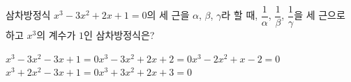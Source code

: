 삼차방정식 $x^3-3x^2+2x+1=0$의 세 근을 $\alpha$, $\beta$, $\gamma$라 할 때, $\dfrac{1}{\alpha}$, $\dfrac{1}{\beta}$, $\dfrac{1}{\gamma}$을 세 근으로 하고 $x^3$의 계수가 $1$인 삼차방정식은?
\begin{choicesv}{$x^3-3x^2-3x+1=0$}{$x^3-3x^2+2x+2=0$}{$x^3-2x^2+x-2=0$}{$x^3+2x^2-3x+1=0$}{$x^3+3x^2+2x+3=0$}\end{choicesv}
